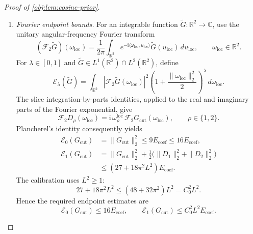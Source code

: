 \documentclass[11pt]{article}
\begin{document}
\begin{proof}[Proof of \cref{obj:lem:cosine-prior}]
\begin{enumerate}
\[\begin{aligned}
 \leq9\pi^2L^2E_{\mathrm{coef}},\\
\int_{[-1,2]^2}|\partial_2U_{\mathrm{loc}}|^2
&=9\pi^2\sum_{a,b=1}^L b^2(c^{\mathrm{loc}}_{ab})^2
 \leq9\pi^2L^2E_{\mathrm{coef}},\\
\int_{[-1,2]^2}\|\nabla U_{\mathrm{loc}}\|_2^2
&\leq18\pi^2L^2E_{\mathrm{coef}}.
\end{aligned}
\]
Since \(0\leq\chi_{\mathrm{cut}}\leq1\),
\[
\|G_{\mathrm{cut}}\|_{L^2(\mathbb R^2)}^2
\leq9E_{\mathrm{coef}}.
\]
For each coordinate, apply
\((r_1+r_2)^2\leq2r_1^2+2r_2^2\), valid for real \(r_1,r_2\), to the
two terms defining \(D_\rho\). Summing the two coordinate inequalities
and using the cutoff derivative bound gives
\[
\frac12(D_1^2+D_2^2)
\leq
\chi_{\mathrm{cut}}^2
 \bigl(|\partial_1U_{\mathrm{loc}}|^2+
       |\partial_2U_{\mathrm{loc}}|^2\bigr)
+2|U_{\mathrm{loc}}|^2.
\]
Thus
\[
D_1^2+D_2^2
\leq2\|\nabla U_{\mathrm{loc}}\|_2^2+4|U_{\mathrm{loc}}|^2
\]
on the support square. Integration proves
\[
\|D_1\|_{L^2(\mathbb R^2)}^2+
\|D_2\|_{L^2(\mathbb R^2)}^2
\leq(36+36\pi^2L^2)E_{\mathrm{coef}}.
\]

\item \emph{Fourier endpoint bounds.}
For an integrable function
\(\widetilde G:\mathbb R^2\to\mathbb C\), use the unitary angular-frequency
Fourier transform
\[
(\mathcal F_2\widetilde G)(\omega_{\mathrm{loc}})
=\frac{1}{2\pi}\int_{\mathbb R^2}
 e^{-\mathrm i\langle\omega_{\mathrm{loc}},u_{\mathrm{loc}}\rangle}
 \widetilde G(u_{\mathrm{loc}})\,du_{\mathrm{loc}},
\qquad \omega_{\mathrm{loc}}\in\mathbb R^2.
\]
For \(\lambda\in[0,1]\) and
\(\widetilde G\in L^1(\mathbb R^2)\cap L^2(\mathbb R^2)\), define
\[
\mathcal E_\lambda(\widetilde G)
=\int_{\mathbb R^2}
 |\mathcal F_2\widetilde G(\omega_{\mathrm{loc}})|^2
 \left(1+\frac{\|\omega_{\mathrm{loc}}\|_2^2}{2}\right)^\lambda
 \,d\omega_{\mathrm{loc}}.
\]
The slice integration-by-parts identities, applied to the real and
imaginary parts of the Fourier exponential, give
\[
\mathcal F_2D_\rho(\omega_{\mathrm{loc}})
=\mathrm i\,\omega_\rho^{\mathrm{loc}}\,
 \mathcal F_2G_{\mathrm{cut}}(\omega_{\mathrm{loc}}),
\qquad \rho\in\{1,2\}.
\]
Plancherel's identity consequently yields
\[
\begin{aligned}
\mathcal E_0(G_{\mathrm{cut}})
&=\|G_{\mathrm{cut}}\|_2^2
 \leq9E_{\mathrm{coef}}
 \leq16E_{\mathrm{coef}},\\
\mathcal E_1(G_{\mathrm{cut}})
&=\|G_{\mathrm{cut}}\|_2^2
 +\frac12\bigl(\|D_1\|_2^2+\|D_2\|_2^2\bigr)\\
&\leq(27+18\pi^2L^2)E_{\mathrm{coef}}.
\end{aligned}
\]
The calibration uses \(L^2\geq1\):
\[
27+18\pi^2L^2
\leq(48+32\pi^2)L^2=C_0^2L^2.
\]
Hence the required endpoint estimates are
\[
\mathcal E_0(G_{\mathrm{cut}})\leq16E_{\mathrm{coef}},
\qquad
\mathcal E_1(G_{\mathrm{cut}})\leq C_0^2L^2E_{\mathrm{coef}}.
\]


\end{enumerate}
\end{proof}
\end{document}
